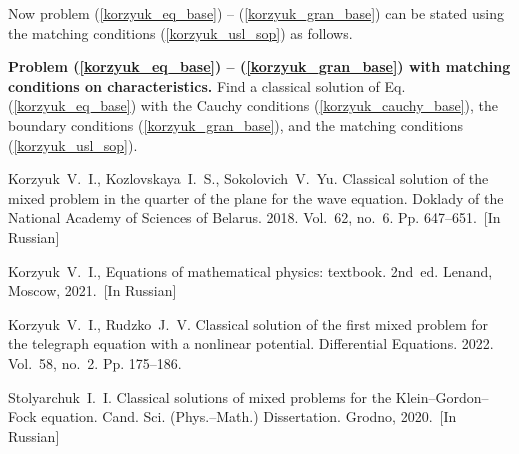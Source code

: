 \documentclass[12pt]{llncs}
\begin{document}
Now problem (\ref{korzyuk_eq_base}) -- (\ref{korzyuk_gran_base}) can be stated using the matching conditions (\ref{korzyuk_usl_sop}) as follows.

{\bf Problem (\ref{korzyuk_eq_base}) -- (\ref{korzyuk_gran_base}) with matching conditions on characteristics.} Find a classical solution of Eq. (\ref{korzyuk_eq_base}) with the Cauchy conditions (\ref{korzyuk_cauchy_base}), the boundary conditions (\ref{korzyuk_gran_base}), and the matching
conditions (\ref{korzyuk_usl_sop}).

\begin{thebibliography}{9} %
 Korzyuk~V.~I., Kozlovskaya~I.~S., Sokolovich~V.~Yu. Classical solution of the mixed problem in the quarter of the plane for the wave equation. Doklady of the National Academy of Sciences of Belarus. 2018. Vol.~62, no.~6. Pp. 647--651.~[In Russian]

 Korzyuk~V.~I., Equations of mathematical physics: textbook. 2nd~ed. Lenand, Moscow, 2021.~[In Russian]

 Korzyuk~V.~I., Rudzko~J.~V. Classical solution of the first mixed problem for the telegraph equation with a nonlinear potential. Differential Equations. 2022. Vol.~58, no.~2. Pp. 175--186.

 Stolyarchuk~I.~I. Classical solutions of mixed problems for the Klein--Gordon--Fock equation. Cand. Sci. (Phys.--Math.) Dissertation. Grodno, 2020.~[In Russian]

\end{thebibliography}
\end{document}

